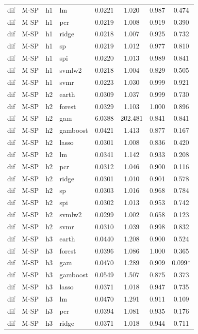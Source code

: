 \begin{ThreePartTable}
\begin{longtable}[t]{llclcccc}
dif & M-SP & h1 & lm & 0.0221 & 1.020 & 0.987 & 0.474\\
dif & M-SP & h1 & pcr & 0.0219 & 1.008 & 0.919 & 0.390\\
dif & M-SP & h1 & ridge & 0.0218 & 1.007 & 0.925 & 0.732\\
dif & M-SP & h1 & sp & 0.0219 & 1.012 & 0.977 & 0.810\\
dif & M-SP & h1 & spi & 0.0220 & 1.013 & 0.989 & 0.841\\
dif & M-SP & h1 & svmlw2 & 0.0218 & 1.004 & 0.829 & 0.505\\
dif & M-SP & h1 & svmr & 0.0223 & 1.030 & 0.999 & 0.921\\
\addlinespace
dif & M-SP & h2 & earth & 0.0309 & 1.037 & 0.999 & 0.730\\
dif & M-SP & h2 & forest & 0.0329 & 1.103 & 1.000 & 0.896\\
dif & M-SP & h2 & gam & 6.0388 & 202.481 & 0.841 & 0.841\\
dif & M-SP & h2 & gamboost & 0.0421 & 1.413 & 0.877 & 0.167\\
dif & M-SP & h2 & lasso & 0.0301 & 1.008 & 0.836 & 0.420\\
dif & M-SP & h2 & lm & 0.0341 & 1.142 & 0.933 & 0.208\\
dif & M-SP & h2 & pcr & 0.0312 & 1.046 & 0.900 & 0.116\\
dif & M-SP & h2 & ridge & 0.0301 & 1.010 & 0.901 & 0.578\\
dif & M-SP & h2 & sp & 0.0303 & 1.016 & 0.968 & 0.784\\
dif & M-SP & h2 & spi & 0.0302 & 1.013 & 0.953 & 0.742\\
dif & M-SP & h2 & svmlw2 & 0.0299 & 1.002 & 0.658 & 0.123\\
dif & M-SP & h2 & svmr & 0.0310 & 1.039 & 0.998 & 0.832\\
\addlinespace
dif & M-SP & h3 & earth & 0.0440 & 1.208 & 0.900 & 0.524\\
dif & M-SP & h3 & forest & 0.0396 & 1.086 & 1.000 & 0.365\\
dif & M-SP & h3 & gam & 0.0470 & 1.289 & 0.909 & 0.099*\\
dif & M-SP & h3 & gamboost & 0.0549 & 1.507 & 0.875 & 0.373\\
dif & M-SP & h3 & lasso & 0.0371 & 1.018 & 0.947 & 0.735\\
dif & M-SP & h3 & lm & 0.0470 & 1.291 & 0.911 & 0.109\\
dif & M-SP & h3 & pcr & 0.0394 & 1.081 & 0.935 & 0.176\\
dif & M-SP & h3 & ridge & 0.0371 & 1.018 & 0.944 & 0.711\\

\end{longtable}
\end{ThreePartTable}
